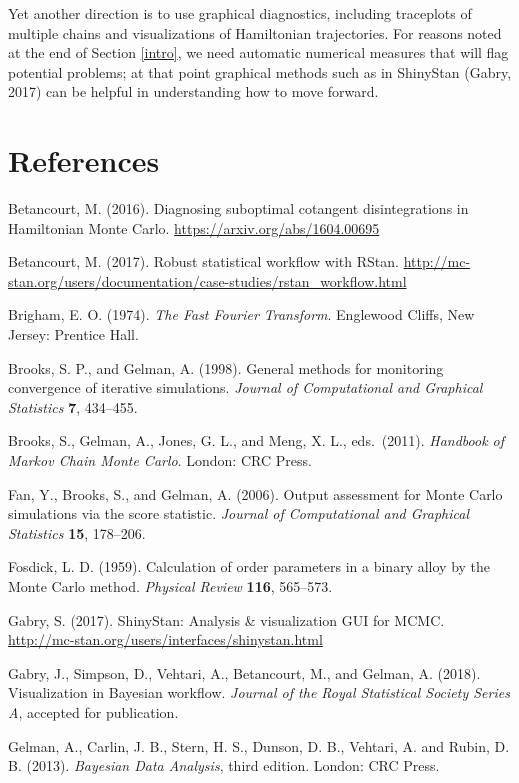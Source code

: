 \documentclass[11pt]{article}
\begin{document}
Yet another direction is to use graphical diagnostics, including traceplots of multiple chains and visualizations of Hamiltonian trajectories.  For reasons noted at the end of Section \ref{intro}, we need automatic numerical measures that will flag potential problems; at that point graphical methods such as in ShinyStan (Gabry, 2017) can be helpful in understanding how to move forward.

\section*{References}

\noindent

\bibitem Betancourt, M. (2016).  Diagnosing suboptimal cotangent disintegrations in Hamiltonian Monte Carlo. \url{https://arxiv.org/abs/1604.00695}

\bibitem Betancourt, M. (2017).  Robust statistical workflow with RStan.  \url{http://mc-stan.org/users/documentation/case-studies/rstan_workflow.html}

\bibitem Brigham, E. O. (1974). {\em The Fast Fourier Transform}.  Englewood Cliffs, New Jersey: Prentice Hall.

\bibitem Brooks, S. P., and Gelman, A. (1998).  General methods for monitoring convergence of iterative simulations.  {\em Journal of Computational and Graphical Statistics} {\bf 7}, 434--455.

\bibitem Brooks, S., Gelman, A., Jones, G. L., and Meng, X. L., eds.\ (2011).  {\em Handbook of Markov Chain Monte Carlo}.  London:  CRC Press.

\bibitem Fan, Y., Brooks, S., and Gelman, A. (2006).  Output assessment for Monte Carlo simulations via the score statistic. {\em Journal of Computational and Graphical Statistics} {\bf 15}, 178--206.

\bibitem Fosdick, L. D. (1959).  Calculation of order parameters in a binary alloy by the Monte Carlo method. {\em Physical Review} {\bf 116}, 565--573.

\bibitem Gabry, S. (2017).  ShinyStan:  Analysis \& visualization GUI for MCMC.  \url{http://mc-stan.org/users/interfaces/shinystan.html}

\bibitem Gabry, J., Simpson, D., Vehtari, A., Betancourt, M., and Gelman, A. (2018). Visualization in Bayesian workflow. {\em Journal of the Royal Statistical Society Series A}, accepted for publication.
  
\bibitem Gelman, A., Carlin, J. B., Stern, H. S., Dunson, D. B., Vehtari, A. and Rubin, D. B. (2013). {\em Bayesian Data Analysis}, third edition. London:  CRC Press.
\end{document}
